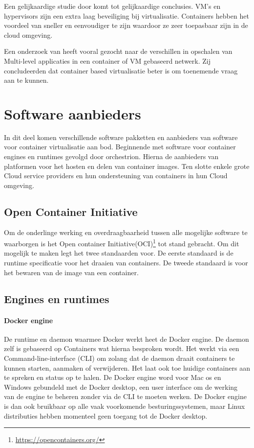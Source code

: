 Een gelijkaardige studie door \textcite{Eder2016} komt tot gelijkaardige conclusies. VM’s en hypervisors zijn een extra laag beveiliging bij virtualisatie. Containers hebben het voordeel van sneller en eenvoudiger te zijn waardoor ze zeer toepasbaar zijn in de cloud omgeving.

Een onderzoek van \textcite{Abdullah2019} heeft vooral gezocht naar de verschillen in opschalen van Multi-level applicaties in een container of VM gebaseerd netwerk. Zij concludeerden dat container based virtualisatie beter is om toenemende vraag aan te kunnen.


\section{Software aanbieders}
In dit deel komen verschillende software pakketten en aanbieders van software voor container virtualisatie aan bod. Beginnende met software voor container engines en runtimes gevolgd door orchestrion.  Hierna de aanbieders van platformen voor het hosten en delen van container images. Ten slotte enkele grote Cloud service providers en hun ondersteuning van containers in hun Cloud omgeving.


\subsection{Open Container Initiative}
Om de onderlinge werking en overdraagbaarheid tussen alle mogelijke software te waarborgen is het Open container Initiative(OCI)\footnote{\url{https://opencontainers.org/}} tot stand gebracht. Om dit mogelijk te maken legt het twee standaarden voor. De eerste standaard is de runtime specificatie voor het draaien van containers. De tweede standaard is voor het bewaren van de image van een container.


\subsection{Engines en runtimes}

\paragraph{Docker engine}
De runtime en daemon waarmee Docker werkt heet de Docker engine. De daemon zelf is gebaseerd op Containers wat hierna besproken wordt. Het werkt via een Command-line-interface (CLI) om zolang dat de daemon draait containers te kunnen starten, aanmaken of verwijderen. Het laat ook toe huidige containers aan te spreken en status op te halen. De Docker engine word voor Mac os en Windows gebundeld met de Docker desktop, een user interface om de werking van de engine te beheren zonder via de CLI  te moeten werken. De Docker engine is dan ook bruikbaar op alle vaak voorkomende besturingssystemen, maar Linux distributies hebben momenteel geen toegang tot de Docker desktop.
